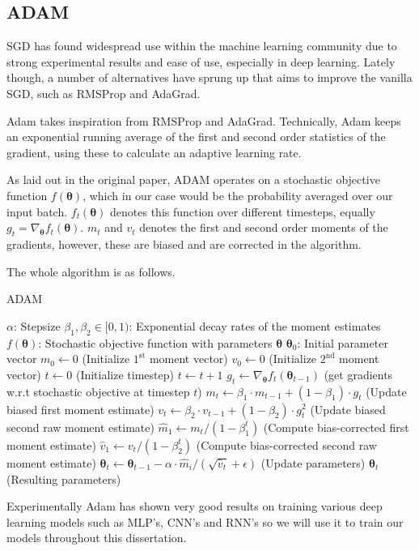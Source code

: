 \subsection{ADAM}
SGD has found widespread use within the machine learning community due to strong
experimental results and ease of use, especially in deep learning. Lately
though, a number of alternatives have sprung up that aims to improve the vanilla
SGD, such as RMSProp\cite{Tieleman2012} and AdaGrad\cite{Duchi:EECS-2010-24}.

Adam takes inspiration from RMSProp and AdaGrad. Technically, Adam keeps an
exponential running average of the first and second order statistics of the
gradient, using these to calculate an adaptive learning rate.

As laid out in the original paper, ADAM operates on a stochastic objective
function $f(\bm{\theta})$, which in our case would be the probability averaged
over our input batch. $f_t(\bm{\theta})$ denotes this function over different
timesteps, equally $g_t = \nabla_{\bm{\theta}} f_t(\bm{\theta})$. $m_t$ and
$v_t$ denotes the first and second order moments of the gradients, however,
these are biased and are corrected in the algorithm.

The whole algorithm is as follows.

\begin{algorithm}
  \caption{ADAM}\label{ADAM}
  \begin{algorithmic}[1]
    \Require $\alpha$: Stepsize
    \Require $\beta_1, \beta_2 \in [0, 1)$: Exponential decay rates of the moment estimates
    \Require $f(\bm{\theta})$: Stochastic objective function with parameters
    $\bm{\theta}$
    \Require $\bm{\theta}_0$: Initial parameter vector
    \State $m_0 \gets 0$ (Initialize $1^{\text{st}}$ moment vector)
    \State $v_0 \gets 0$ (Initialize $2^{\text{nd}}$ moment vector)
    \State $t \gets 0$ (Initialize timestep)
    \State $t \gets t + 1$
    \State $g_t \gets \nabla_{\bm{\theta}}f_t(\bm{\theta}_{t-1})$ (get gradients w.r.t stochastic objective at timestep $t$)
    \State $m_t \gets \beta_1 \cdot m_{t-1} + (1 - \beta_1) \cdot g_t$ (Update biased first moment estimate)
    \State $v_t \gets \beta_2 \cdot v_{t-1} + (1 - \beta_2) \cdot g^2_t$ (Update biased second raw moment estimate)
    \State $\hat{m}_1 \gets m_t / (1 - \beta^t_1)$ (Compute bias-corrected first moment estimate)
    \State $\hat{v}_1 \gets v_t / (1 - \beta^t_2)$ (Compute bias-corrected second raw moment estimate)
    \State $\bm{\theta}_t \gets \bm{\theta}_{t-1} - \alpha \cdot \hat{m}_i/(\sqrt{\hat{v}_t} + \epsilon)$ (Update parameters)
    \EndWhile
    \Return $\bm{\theta}_t$ (Resulting parameters)
  \end{algorithmic}
\end{algorithm}

Experimentally Adam has shown very good results on training various deep
learning models such as MLP's, CNN's and RNN's so we will use it to train our
models throughout this dissertation\cite{kingma_adam:_2014}.